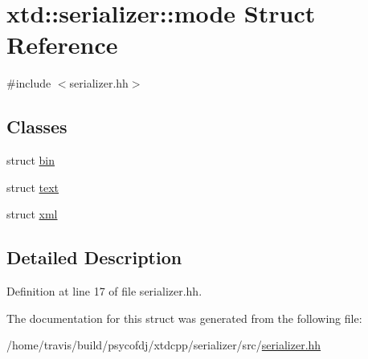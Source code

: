 \hypertarget{structxtd_1_1serializer_1_1mode}{\section{xtd\-:\-:serializer\-:\-:mode Struct Reference}
\label{structxtd_1_1serializer_1_1mode}
}


{\ttfamily \#include $<$serializer.\-hh$>$}

\subsection*{Classes}
\begin{DoxyCompactItemize}
\item 
struct \hyperlink{structxtd_1_1serializer_1_1mode_1_1bin}{bin}
\item 
struct \hyperlink{structxtd_1_1serializer_1_1mode_1_1text}{text}
\item 
struct \hyperlink{structxtd_1_1serializer_1_1mode_1_1xml}{xml}
\end{DoxyCompactItemize}


\subsection{Detailed Description}


Definition at line 17 of file serializer.\-hh.



The documentation for this struct was generated from the following file\-:\begin{DoxyCompactItemize}
\item 
/home/travis/build/psycofdj/xtdcpp/serializer/src/\hyperlink{serializer_8hh}{serializer.\-hh}\end{DoxyCompactItemize}

